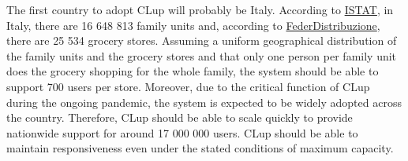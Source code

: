 \documentclass[../../main.tex]{subfiles}
\begin{document}
The first country to adopt CLup will probably be Italy. According to \href{http://dati-censimentopopolazione.istat.it/Index.aspx?DataSetCode=DICA_NUCLEI}{ISTAT}, in Italy, 
there are 16 648 813 family units and, according to \href{https://www.federdistribuzione.it/mappa-distributiva/}{FederDistribuzione}, there are 25 534 grocery stores. 
Assuming a uniform geographical distribution of the family units and the grocery stores and that only one person per family unit does the grocery shopping for the whole family, 
the system should be able to support 700 users per store. 
Moreover, due to the critical function of CLup during the ongoing pandemic, the system is expected to be widely adopted across the country. 
Therefore, CLup should be able to scale quickly to provide nationwide support for around 17 000 000 users. 
CLup should be able to maintain responsiveness even under the stated conditions of maximum capacity.
\end{document}
